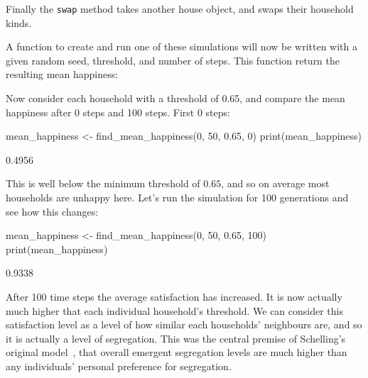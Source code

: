 Finally the \texttt{swap} method takes another house object, and
swaps their household kinds.

A function to create and run one of these simulations will now be written
with a given random seed, threshold, and number of steps. This function return
the resulting mean happiness:


Now consider each household with a threshold of
0.65, and compare the mean happiness after 0 steps and 100 steps.
First 0 steps:

\begin{Rin}
mean_happiness <- find_mean_happiness(0, 50, 0.65, 0)
print(mean_happiness)
\end{Rin}

\begin{Rout}
[1] 0.4956
\end{Rout}

This is well below the minimum threshold of \(0.65\), and so on average most
households are unhappy here.
Let's run the simulation for 100 generations and see how this changes:

\begin{Rin}
mean_happiness <- find_mean_happiness(0, 50, 0.65, 100)
print(mean_happiness)
\end{Rin}

\begin{Rout}
[1] 0.9338
\end{Rout}

After 100 time steps the average satisfaction has increased.
It is now actually much higher that each individual household's threshold.
We can consider this satisfaction level as a level of how similar each
households' neighbours are, and so it is actually a level of segregation.
This was the central premise of Schelling's original
model~\cite{schelling2006micromotives}, that overall
emergent segregation levels are much higher than any individuals' personal
preference for segregation.

